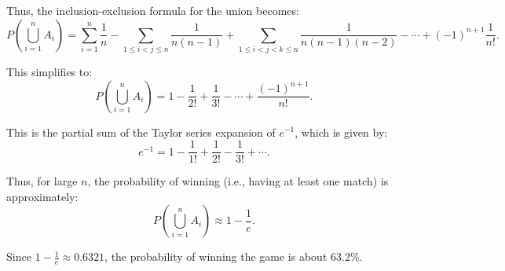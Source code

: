 Thus, the inclusion-exclusion formula for the union becomes:
\[
P\left(\bigcup_{i=1}^n A_i\right) = \sum_{i=1}^n \frac{1}{n} - \sum_{1 \leq i < j \leq n} \frac{1}{n(n-1)} + \sum_{1 \leq i < j < k \leq n} \frac{1}{n(n-1)(n-2)} - \cdots + (-1)^{n+1} \frac{1}{n!}.
\]

This simplifies to:
\[
P\left(\bigcup_{i=1}^n A_i\right) = 1 - \frac{1}{2!} + \frac{1}{3!} - \cdots + \frac{(-1)^{n+1}}{n!}.
\]

This is the partial sum of the Taylor series expansion of \(e^{-1}\), which is given by:
\[
e^{-1} = 1 - \frac{1}{1!} + \frac{1}{2!} - \frac{1}{3!} + \cdots.
\]

Thus, for large \(n\), the probability of winning (i.e., having at least one match) is approximately:
\[
P\left(\bigcup_{i=1}^n A_i\right) \approx 1 - \frac{1}{e}.
\]

Since \(1 - \frac{1}{e} \approx 0.6321\), the probability of winning the game is about 63.2\%.


